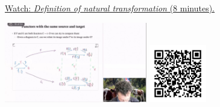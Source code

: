 
\begin{minipage}{10cm}
    \href{https://act4e-spring21.netlify.app/videos/spring2021-nat-trafos:natural-trafos:nat-trafo-def.html}{Watch: \emph{Definition of natural transformation} (8 minutes).}
        
    \href{https://act4e-spring21.netlify.app/videos/spring2021-nat-trafos:natural-trafos:nat-trafo-def.html}{\includegraphics[height=3.5cm]{spring2021-nat-trafos:natural-trafos:nat-trafo-def/thumbnails.jpg}}
    \href{https://act4e-spring21.netlify.app/videos/spring2021-nat-trafos:natural-trafos:nat-trafo-def.html}{\includegraphics[height=2.5cm]{spring2021-nat-trafos:natural-trafos:nat-trafo-def/qrcode.png}}
\end{minipage}
